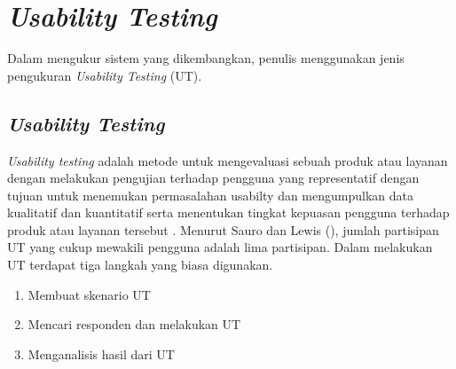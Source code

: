 \section{\textit{Usability Testing}}

Dalam mengukur sistem yang dikembangkan, penulis menggunakan jenis pengukuran \textit{Usability Testing} (UT).
	\subsection{\textit{Usability Testing}}
	\textit{Usability testing} adalah metode untuk mengevaluasi sebuah produk atau layanan dengan melakukan pengujian terhadap pengguna yang representatif dengan tujuan untuk menemukan permasalahan usabilty dan mengumpulkan data kualitatif dan kuantitatif serta menentukan tingkat kepuasan pengguna terhadap produk atau layanan tersebut \citep{article.usability}.
	\linebreak\linebreak
	Menurut Sauro dan Lewis (\citeyear{papper.lewis}), jumlah partisipan UT yang cukup mewakili pengguna adalah lima partisipan. Dalam melakukan UT terdapat tiga langkah yang biasa digunakan.
	\begin{enumerate}
		\item Membuat skenario UT
		\item Mencari responden dan melakukan UT
		\item Menganalisis hasil dari UT
	\end{enumerate}